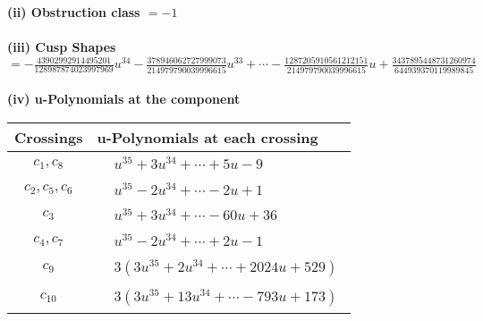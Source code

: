 \documentclass[1p]{elsarticle_modified}
\theoremstyle{definition}
\begin{document}
\flushleft \textbf{(ii) Obstruction class $= -1$}\\~\\
\flushleft \textbf{(iii) Cusp Shapes $= -\frac{43902992914495201}{128987874023997969} u^{34}-\frac{378946062727999073}{214979790039996615} u^{33}+\cdots-\frac{1287205910561212151}{214979790039996615} u+\frac{3437895448731260974}{644939370119989845}$}\\~\\
\newpage\renewcommand{\arraystretch}{1}
\flushleft \textbf{(iv) u-Polynomials at the component}\newline \\
\begin{tabular}{m{50pt}|m{274pt}}
Crossings & \hspace{64pt}u-Polynomials at each crossing \\
\hline $$\begin{aligned}c_{1},c_{8}\end{aligned}$$&$\begin{aligned}
&u^{35}+3 u^{34}+\cdots+5 u-9
\end{aligned}$\\
\hline $$\begin{aligned}c_{2},c_{5},c_{6}\end{aligned}$$&$\begin{aligned}
&u^{35}-2 u^{34}+\cdots-2 u+1
\end{aligned}$\\
\hline $$\begin{aligned}c_{3}\end{aligned}$$&$\begin{aligned}
&u^{35}+3 u^{34}+\cdots-60 u+36
\end{aligned}$\\
\hline $$\begin{aligned}c_{4},c_{7}\end{aligned}$$&$\begin{aligned}
&u^{35}-2 u^{34}+\cdots+2 u-1
\end{aligned}$\\
\hline $$\begin{aligned}c_{9}\end{aligned}$$&$\begin{aligned}
&3(3 u^{35}+2 u^{34}+\cdots+2024 u+529)
\end{aligned}$\\
\hline $$\begin{aligned}c_{10}\end{aligned}$$&$\begin{aligned}
&3(3 u^{35}+13 u^{34}+\cdots-793 u+173)
\end{aligned}$\\
\hline
\end{tabular}\\~\\
\end{document}
